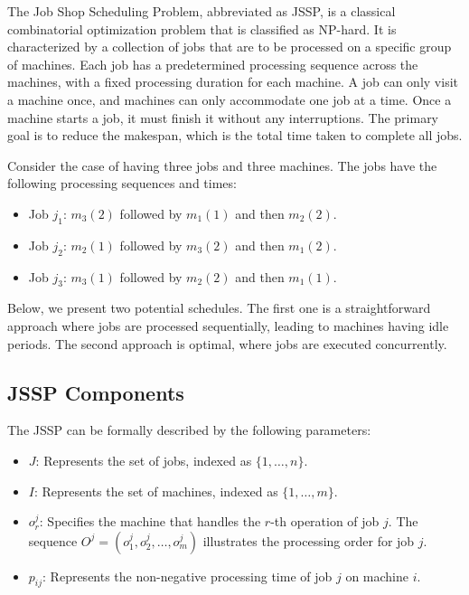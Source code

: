 {The Job Shop Scheduling Problem, abbreviated as JSSP, is a classical combinatorial optimization problem that is classified as NP-hard. It is characterized by a collection of jobs that are to be processed on a specific group of machines. Each job has a predetermined processing sequence across the machines, with a fixed processing duration for each machine. A job can only visit a machine once, and machines can only accommodate one job at a time. Once a machine starts a job, it must finish it without any interruptions. The primary goal is to reduce the makespan, which is the total time taken to complete all jobs.

Consider the case of having three jobs and three machines. The jobs have the following processing sequences and times:

\begin{itemize}
  \item Job \( j_1 \): \( m_3(2) \) followed by \( m_1(1) \) and then \( m_2(2) \).
  \item Job \( j_2 \): \( m_2(1) \) followed by \( m_3(2) \) and then \( m_1(2) \).
  \item Job \( j_3 \): \( m_3(1) \) followed by \( m_2(2) \) and then \( m_1(1) \).
\end{itemize}

Below, we present two potential schedules. The first one is a straightforward approach where jobs are processed sequentially, leading to machines having idle periods. The second approach is optimal, where jobs are executed concurrently.

\subsection{JSSP Components}
The JSSP can be formally described by the following parameters:

\begin{itemize}
  \item \( J\): Represents the set of jobs, indexed as \( \{1, \ldots, n\} \).
  \item \( I\): Represents the set of machines, indexed as \( \{1, \ldots, m\} \).
  \item \( o_r^j \): Specifies the machine that handles the \( r \)-th operation of job \( j \). The sequence \( O^j=\left(o_1^j, o_2^j, \ldots, o_m^j\right) \) illustrates the processing order for job \( j \).
  \item \( p_{i j} \): Represents the non-negative processing time of job \( j \) on machine \( i \).
\end{itemize}

}
